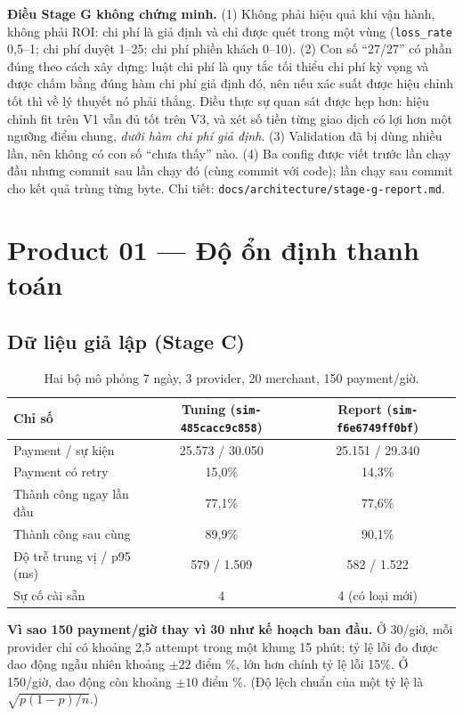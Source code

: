 \documentclass[11pt,a4paper]{article}
\newcommand{\code}[1]{\texttt{\small #1}}
\begin{document}
\begin{keypoint}
\textbf{Điều Stage G không chứng minh.} (1) Không phải hiệu quả khi vận hành, không phải ROI: chi phí là giả định và chỉ được quét trong một vùng (\code{loss\_rate} 0,5--1; chi phí duyệt 1--25; chi phí phiền khách 0--10). (2) Con số ``27/27'' có phần đúng theo cách xây dựng: luật chi phí là quy tắc tối thiểu chi phí kỳ vọng và được chấm bằng đúng hàm chi phí giả định đó, nên nếu xác suất được hiệu chỉnh tốt thì về lý thuyết nó phải thắng. Điều thực sự quan sát được hẹp hơn: hiệu chỉnh fit trên V1 vẫn đủ tốt trên V3, và xét số tiền từng giao dịch có lợi hơn một ngưỡng điểm chung, \emph{dưới hàm chi phí giả định}. (3) Validation đã bị dùng nhiều lần, nên không có con số ``chưa thấy'' nào. (4) Ba config được viết trước lần chạy đầu nhưng commit sau lần chạy đó (cùng commit với code); lần chạy sau commit cho kết quả trùng từng byte. Chi tiết: \code{docs/architecture/stage-g-report.md}.
\end{keypoint}

\section{Product 01 — Độ ổn định thanh toán}

\subsection{Dữ liệu giả lập (Stage C)}
\begin{table}[H]\centering
\caption{Hai bộ mô phỏng 7 ngày, 3 provider, 20 merchant, 150 payment/giờ.}
\begin{tabular}{@{}lcc@{}}
\toprule
Chỉ số & Tuning (\code{sim-485cacc9c858}) & Report (\code{sim-f6e6749ff0bf}) \\ \midrule
Payment / sự kiện & 25.573 / 30.050 & 25.151 / 29.340 \\
Payment có retry & 15,0\% & 14,3\% \\
Thành công ngay lần đầu & 77,1\% & 77,6\% \\
Thành công sau cùng & 89,9\% & 90,1\% \\
Độ trễ trung vị / p95 (ms) & 579 / 1.509 & 582 / 1.522 \\
Sự cố cài sẵn & 4 & 4 (có loại mới) \\ \bottomrule
\end{tabular}
\end{table}

\textbf{Vì sao 150 payment/giờ thay vì 30 như kế hoạch ban đầu.} Ở 30/giờ, mỗi provider chỉ có khoảng 2,5 attempt trong một khung 15 phút; tỷ lệ lỗi đo được dao động ngẫu nhiên khoảng $\pm 22$ điểm \%, lớn hơn chính tỷ lệ lỗi 15\%. Ở 150/giờ, dao động còn khoảng $\pm 10$ điểm \%. (Độ lệch chuẩn của một tỷ lệ là $\sqrt{p(1-p)/n}$.)
\end{document}
